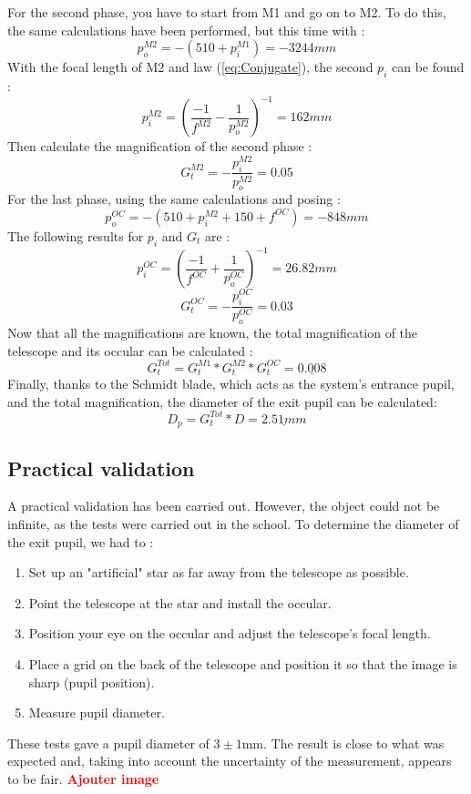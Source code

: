 For the second phase, you have to start from M1 and go on to M2. To do this, the same calculations have been performed, but this time with :
\begin{equation}
    p_o^{M2} = -(510 + p_i^{M1}) = -3244mm
\end{equation}
With the focal length of M2 and law (\ref{eq:Conjugate}), the second $p_i$ can be found :
\begin{equation}
    p_i^{M2} = \left(\frac{-1}{f^{M2}}-\frac{1}{p_o^{M2}}\right)^{-1} = 162 mm
\end{equation}
Then calculate the magnification of the second phase :
\begin{equation}
    G_t^{M2} = -\frac{p_i^{M2}}{p_o^{M2}} = 0.05
\end{equation}
For the last phase, using the same calculations and posing :
\begin{equation}
    p_o^{OC} = -(510 + p_i^{M2} + 150 + f^{OC}) = -848mm
\end{equation}
The following results for $p_i$ and $G_t$ are :
\begin{equation}
    p_i^{OC} = \left(\frac{-1}{f^{OC}}+\frac{1}{p_o^{OC}}\right)^{-1} = 26.82 mm
\end{equation}
\begin{equation}
    G_t^{OC} = -\frac{p_i^{OC}}{p_o^{OC}} = 0.03
\end{equation}
Now that all the magnifications are known, the total magnification of the telescope and its occular can be calculated :
\begin{equation}
    G_t^{Tot} = G_t^{M1}*G_t^{M2}*G_t^{OC} = \underline{0.008}
\end{equation}
Finally, thanks to the Schmidt blade, which acts as the system's entrance pupil, and the total magnification,
the diameter of the exit pupil can be calculated:
\begin{equation}
    D_p = G_t^{Tot} * D = \underline{2.51mm}
\end{equation}
\subsection{Practical validation}
A practical validation has been carried out. However, the object could not be infinite, as the tests were carried out in the school. 
To determine the diameter of the exit pupil, we had to :
\begin{enumerate}
    \item Set up an "artificial" star as far away from the telescope as possible.
    \item Point the telescope at the star and install the occular.
    \item Position your eye on the occular and adjust the telescope's focal length.
    \item Place a grid on the back of the telescope and position it so that the image is sharp (pupil position).
    \item Measure pupil diameter.
\end{enumerate}
These tests gave a pupil diameter of $3 \pm 1$mm. The result is close to what was expected and, taking into account 
the uncertainty of the measurement, appears to be fair.
\newline
\textbf{\textcolor{red}{Ajouter image}}
